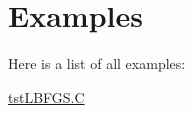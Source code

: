 \section{Examples}
Here is a list of all examples:\begin{DoxyCompactItemize}
\item 
\hyperlink{tstLBFGS_8C-example}{tstLBFGS.C}
\end{DoxyCompactItemize}
